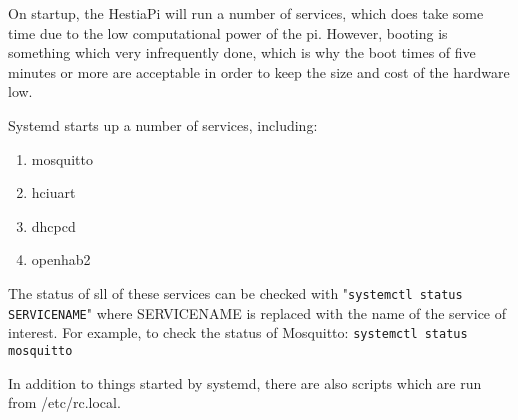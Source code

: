 On startup, the HestiaPi will run a number of services, which does take some
time due to the low computational power of the pi.  However, booting is
something which very infrequently done, which is why the boot times of five
minutes or more are acceptable in order to keep the size and cost of the
hardware low.


Systemd starts up a number of services, including:
\begin{enumerate}
  \item mosquitto
  \item hciuart
  \item dhcpcd
  \item openhab2
\end{enumerate}

The status of sll of these services can be checked with
"\texttt{systemctl status SERVICENAME}" where SERVICENAME is replaced with the
name of the service of interest. For example, to check the status of Mosquitto:
\texttt{systemctl status mosquitto}

In addition to things started by systemd, there are also scripts which are run
from /etc/rc.local.

